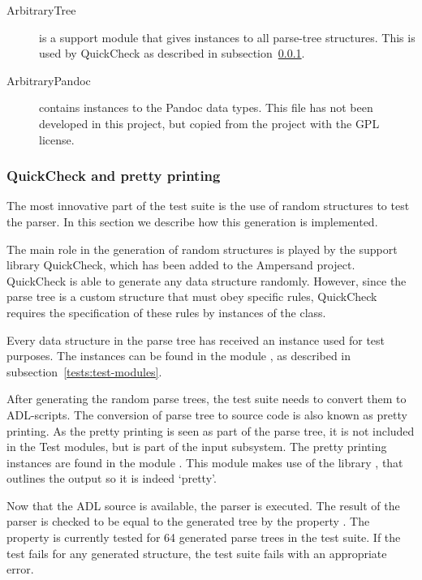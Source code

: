 \begin{description}
    \item[ArbitraryTree] is a support module that gives  instances to all parse-tree structures.
      This is used by QuickCheck as described in subsection~\ref{tests:quick-check}.
    
    \item[ArbitraryPandoc] contains  instances to the Pandoc data types.
      This file has not been developed in this project, but copied from the  project with the GPL license.
  \end{description}

  \subsubsection{QuickCheck and pretty printing}
  \label{tests:quick-check}
  The most innovative part of the test suite is the use of random structures to test the parser.
  In this section we describe how this generation is implemented.
  
  The main role in the generation of random structures is played by the support library QuickCheck, which has been added to the Ampersand project.
  QuickCheck is able to generate any data structure randomly.
  However, since the parse tree is a custom structure that must obey specific rules, QuickCheck requires the specification of these rules by instances of the  class.
  
  Every data structure in the parse tree has received an  instance used for test purposes.
  The instances can be found in the module , as described in subsection~\ref{tests:test-modules}.
  
  After generating the random parse trees, the test suite needs to convert them to ADL-scripts.
  The conversion of parse tree to source code is also known as pretty printing.
  As the pretty printing is seen as part of the parse tree, it is not included in the Test modules, but is part of the input subsystem.
  The pretty printing instances are found in the module .
  This module makes use of the library , that outlines the output so it is indeed `pretty'.
  
  Now that the ADL source is available, the parser is executed.
  The result of the parser is checked to be equal to the generated tree by the property .
  The property is currently tested for 64 generated parse trees in the test suite.
  If the test fails for any generated structure, the test suite fails with an appropriate error.
  
